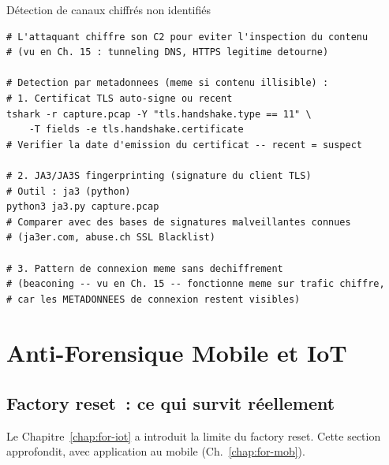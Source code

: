 \begin{boxoutils}{Détection de canaux chiffrés non identifiés}
\begin{lstlisting}[language=bash_forensique]
# L'attaquant chiffre son C2 pour eviter l'inspection du contenu
# (vu en Ch. 15 : tunneling DNS, HTTPS legitime detourne)

# Detection par metadonnees (meme si contenu illisible) :
# 1. Certificat TLS auto-signe ou recent
tshark -r capture.pcap -Y "tls.handshake.type == 11" \
    -T fields -e tls.handshake.certificate
# Verifier la date d'emission du certificat -- recent = suspect

# 2. JA3/JA3S fingerprinting (signature du client TLS)
# Outil : ja3 (python)
python3 ja3.py capture.pcap
# Comparer avec des bases de signatures malveillantes connues
# (ja3er.com, abuse.ch SSL Blacklist)

# 3. Pattern de connexion meme sans dechiffrement
# (beaconing -- vu en Ch. 15 -- fonctionne meme sur trafic chiffre,
# car les METADONNEES de connexion restent visibles)
\end{lstlisting}
\end{boxoutils}

\section{Anti-Forensique Mobile et IoT}
\label{sec:anti-for-mobile-iot}

\subsection{Factory reset~: ce qui survit réellement}

Le Chapitre~\ref{chap:for-iot} a introduit la limite du factory reset.
Cette section approfondit, avec application au mobile (Ch.~\ref{chap:for-mob}).

